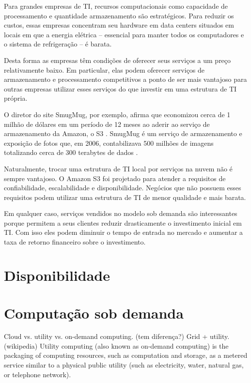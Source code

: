 Para grandes empresas de TI, recursos computacionais como capacidade de processamento e quantidade armazenamento são estratégicos. Para reduzir os custos, essas empresas concentram seu hardware em data centers situados em locais em que a energia elétrica -- essencial para manter todos os computadores e o sistema de refrigeração -- é barata.

Desta forma as empresas têm condições de oferecer seus serviços a um preço relativamente baixo. Em particular, elas podem oferecer serviços de armazenamento e processamento competitivos a ponto de ser mais vantajoso para outras empresas utilizar esses serviços do que investir em uma estrutura de TI própria.

O diretor do site SmugMug, por exemplo, afirma que economizou cerca de 1 milhão de dólares em um período de 12 meses ao aderir ao serviço de armazenamento da Amazon, o S3 \cite{http://blogs.smugmug.com/don/2006/11/10/amazon-s3-show-me-the-money/}. SmugMug é um serviço de armazenamento e exposição de fotos que, em 2006, contabilizava 500 milhões de imagens totalizando cerca de 300 terabytes de dados \cite{http://blogs.smugmug.com/don/2006/08/12/amazon-s3-the-holy-grail/}.

Naturalmente, trocar uma estrutura de TI local por serviços na nuvem não é sempre vantajoso. O Amazon S3 foi projetado para atender a requisitos de confiabilidade, escalabilidade e disponibilidade. Negócios que não possuem esses requisitos podem utilizar uma estrutura de TI de menor qualidade e mais barata.

Em qualquer caso, serviços vendidos no modelo sob demanda são interessantes porque permitem a seus clientes reduzir drasticamente o investimento inicial em TI. Com isso eles podem diminuir o tempo de entrada no mercado e aumentar a taxa de retorno financeiro sobre o investimento.

\section{Disponibilidade}





\section{Computação sob demanda}

        Cloud vs. utility vs. on-demand computing. (tem diferença?) Grid + utility.
          (wikipedia) Utility computing (also known as on-demand computing) is the packaging of computing resources, such as computation and storage, as a metered service similar to a physical public utility (such as electricity, water, natural gas, or telephone network).

